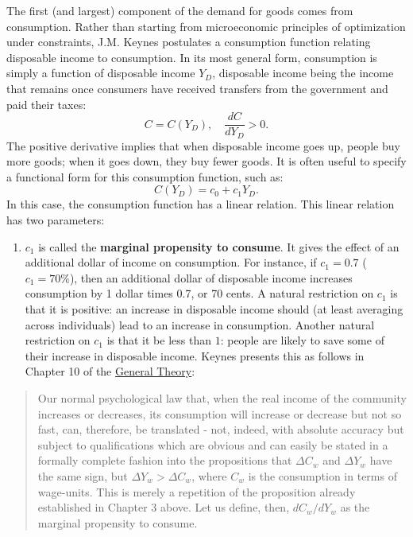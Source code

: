 \documentclass[]{book}
\providecommand{\tightlist}{%
  \setlength{\itemsep}{0pt}\setlength{\parskip}{0pt}}
\theoremstyle{definition}
\theoremstyle{definition}
\theoremstyle{definition}
\theoremstyle{remark}
\begin{document}
The first (and largest) component of the demand for goods comes from
consumption. Rather than starting from microeconomic principles of
optimization under constraints, J.M. Keynes postulates a consumption
function relating disposable income to consumption. In its most general
form, consumption is simply a function of disposable income \(Y_D\),
disposable income being the income that remains once consumers have
received transfers from the government and paid their taxes:
\[C=C(Y_D), \quad \frac{dC}{dY_D}>0.\] The positive derivative implies
that when disposable income goes up, people buy more goods; when it goes
down, they buy fewer goods. It is often useful to specify a functional
form for this consumption function, such as: \[C(Y_D)=c_0+c_1Y_D.\] In
this case, the consumption function has a linear relation. This linear
relation has two parameters:

\begin{enumerate}
\def\labelenumi{\arabic{enumi}.}
\tightlist
\item
  \(c_1\) is called the \textbf{marginal propensity to consume}. It
  gives the effect of an additional dollar of income on consumption. For
  instance, if \(c_1=0.7\) (\(c_1=70\%\)), then an additional dollar of
  disposable income increases consumption by 1 dollar times 0.7, or 70
  cents. A natural restriction on \(c_1\) is that it is positive: an
  increase in disposable income should (at least averaging across
  individuals) lead to an increase in consumption. Another natural
  restriction on \(c_1\) is that it be less than \(1\): people are
  likely to save some of their increase in disposable income. Keynes
  presents this as follows in Chapter 10 of the
  \href{http://cas2.umkc.edu/economics/people/facultypages/kregel/courses/econ645/winter2011/generaltheory.pdf}{General
  Theory}:
\end{enumerate}

\begin{quote}
Our normal psychological law that, when the real income of the community
increases or decreases, its consumption will increase or decrease but
not so fast, can, therefore, be translated - not, indeed, with absolute
accuracy but subject to qualifications which are obvious and can easily
be stated in a formally complete fashion into the propositions that
\(\Delta C_w\) and \(\Delta Y_w\) have the same sign, but
\(\Delta Y_w > \Delta C_w\), where \(C_w\) is the consumption in terms
of wage-units. This is merely a repetition of the proposition already
established in Chapter 3 above. Let us define, then, \(dC_w/dY_w\) as
the marginal propensity to consume.
\end{quote}
\end{document}
